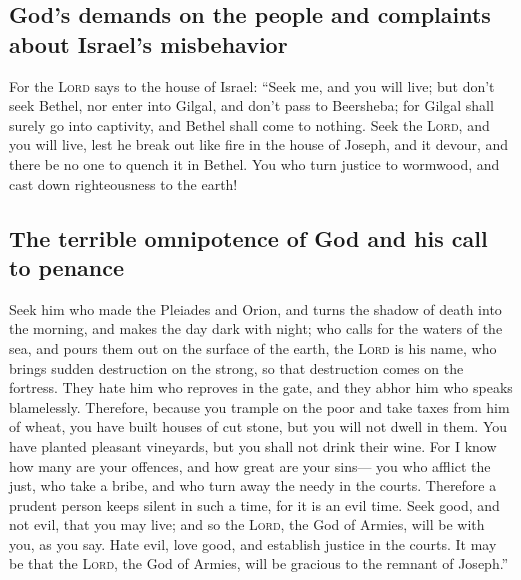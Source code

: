 \hypertarget{gods-demands-on-the-people-and-complaints-about-israels-misbehavior}{%
\subsection{God's demands on the people and complaints about Israel's
misbehavior}\label{gods-demands-on-the-people-and-complaints-about-israels-misbehavior}}

 For the \textsc{Lord} says to the house of Israel: ``Seek
me, and you will live;  but don't seek Bethel, nor enter
into Gilgal, and don't pass to Beersheba; for Gilgal shall surely go
into captivity, and Bethel shall come to nothing.  Seek
the \textsc{Lord}, and you will live, lest he break out like fire in the
house of Joseph, and it devour, and there be no one to quench it in
Bethel.  You who turn justice to wormwood, and cast down
righteousness to the earth!

\hypertarget{the-terrible-omnipotence-of-god-and-his-call-to-penance}{%
\subsection{The terrible omnipotence of God and his call to
penance}\label{the-terrible-omnipotence-of-god-and-his-call-to-penance}}

 Seek him who made the Pleiades and Orion, and turns the
shadow of death into the morning, and makes the day dark with night; who
calls for the waters of the sea, and pours them out on the surface of
the earth, the \textsc{Lord} is his name,  who brings
sudden destruction on the strong, so that destruction comes on the
fortress.  They hate him who reproves in the gate, and
they abhor him who speaks blamelessly.  Therefore,
because you trample on the poor and take taxes from him of wheat, you
have built houses of cut stone, but you will not dwell in them. You have
planted pleasant vineyards, but you shall not drink their wine.
 For I know how many are your offences, and how great are
your sins--- you who afflict the just, who take a bribe, and who turn
away the needy in the courts.  Therefore a prudent person
keeps silent in such a time, for it is an evil time. 
Seek good, and not evil, that you may live; and so the \textsc{Lord},
the God of Armies, will be with you, as you say.  Hate
evil, love good, and establish justice in the courts. It may be that the
\textsc{Lord}, the God of Armies, will be gracious to the remnant of
Joseph.''

